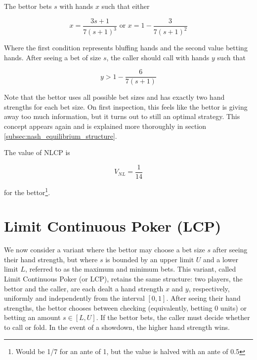 \documentclass[a4paper,12pt]{article}
\theoremstyle{plain}
\theoremstyle{definition}
\begin{document}
The bettor bets $s$ with hands $x$ such that either

$$ x = \frac{3 s+1}{7 (s+1)^3} \text{ or } x = 1 - \frac{3}{7 (s+1)^2} $$

Where the first condition represents bluffing hands and the second value betting hands. After seeing a bet of size $s$, the caller should call with hands $y$ such that

$$ y > 1 - \frac{6}{7 (s+1)} $$

Note that the bettor uses all possible bet sizes and has exactly two hand strengths for each bet size. On first inspection, this feels like the bettor is giving away too much information, but it turns out to still an optimal strategy. This concept appears again and is explained more thoroughly in section \ref{subsec:nash_equilibrium_structure}.

The value of NLCP is

$$ V_{NL} = \frac{1}{14} $$

for the bettor\footnote{Would be 1/7 for an ante of 1, but the value is halved with an ante of 0.5}.

\section{Limit Continuous Poker (LCP)}
We now consider a variant where the bettor may choose a bet size $s$ after seeing their hand strength, but where $s$ is bounded by an upper limit $U$ and a lower limit $L$, referred to as the maximum and minimum bets. This variant, called Limit Continuous Poker (or LCP), retains the same structure: two players, the bettor and the caller, are each dealt a hand strength $x$ and $y$, respectively, uniformly and independently from the interval $[0, 1]$. After seeing their hand strengths, the bettor chooses between checking (equivalently, betting $0$ units) or betting an amount $s \in [L, U]$. If the bettor bets, the caller must decide whether to call or fold. In the event of a showdown, the higher hand strength wins.

\end{document}
